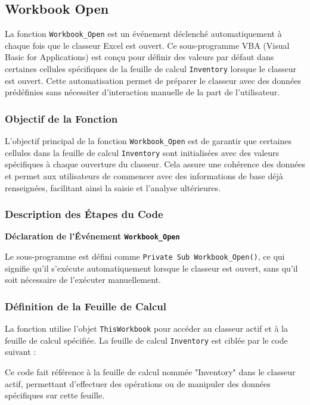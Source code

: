\documentclass[a4paper, oneside, 12pt, final]{extreport}
\begin{document}
\subsection{Workbook Open}

La fonction \texttt{Workbook\_Open} est un événement déclenché automatiquement à chaque fois que le classeur Excel est ouvert. Ce sous-programme VBA (Visual Basic for Applications) est conçu pour définir des valeurs par défaut dans certaines cellules spécifiques de la feuille de calcul \texttt{Inventory} lorsque le classeur est ouvert. Cette automatisation permet de préparer le classeur avec des données prédéfinies sans nécessiter d'interaction manuelle de la part de l'utilisateur.

\subsubsection{Objectif de la Fonction}

L'objectif principal de la fonction \texttt{Workbook\_Open} est de garantir que certaines cellules dans la feuille de calcul \texttt{Inventory} sont initialisées avec des valeurs spécifiques à chaque ouverture du classeur. Cela assure une cohérence des données et permet aux utilisateurs de commencer avec des informations de base déjà renseignées, facilitant ainsi la saisie et l'analyse ultérieures.

\subsubsection{Description des Étapes du Code}

\textbf{Déclaration de l'Événement \texttt{Workbook\_Open}}

Le sous-programme est défini comme \texttt{Private Sub Workbook\_Open()}, ce qui signifie qu'il s'exécute automatiquement lorsque le classeur est ouvert, sans qu'il soit nécessaire de l'exécuter manuellement.

\subsubsection{Définition de la Feuille de Calcul}

La fonction utilise l'objet \texttt{ThisWorkbook} pour accéder au classeur actif et à la feuille de calcul spécifiée. La feuille de calcul \texttt{Inventory} est ciblée par le code suivant :

Ce code fait référence à la feuille de calcul nommée "Inventory" dans le classeur actif, permettant d'effectuer des opérations ou de manipuler des données spécifiques sur cette feuille.
\end{document}
